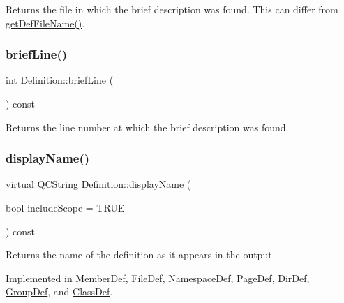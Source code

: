 Returns the file in which the brief description was found. This can differ from \mbox{\hyperlink{class_definition_a9484164b01eca0abce92001b2b77f8c3}{get\+Def\+File\+Name()}}. \mbox{\label{class_definition_a1f87d37cefff16dc8a300795543a7059}} 
\subsubsection{\texorpdfstring{briefLine()}{briefLine()}}
{\footnotesize\ttfamily int Definition\+::brief\+Line (\begin{DoxyParamCaption}{ }\end{DoxyParamCaption}) const}

Returns the line number at which the brief description was found. \mbox{\label{class_definition_ac4741f70f06baac174cf71b3e11d06ac}} 
\subsubsection{\texorpdfstring{displayName()}{displayName()}}
{\footnotesize\ttfamily virtual \mbox{\hyperlink{class_q_c_string}{Q\+C\+String}} Definition\+::display\+Name (\begin{DoxyParamCaption}\item[{bool}]{include\+Scope = {\ttfamily TRUE} }\end{DoxyParamCaption}) const\hspace{0.3cm}{\ttfamily [pure virtual]}}

Returns the name of the definition as it appears in the output 

Implemented in \mbox{\hyperlink{class_member_def_a3c91c8522caa2b1905cd52b3eedad8fa}{Member\+Def}}, \mbox{\hyperlink{class_file_def_ab5973477f072d780c9a184d16b58410b}{File\+Def}}, \mbox{\hyperlink{class_namespace_def_a7893c9a6525e3fc406ddfa9f9dd031f1}{Namespace\+Def}}, \mbox{\hyperlink{class_page_def_a29e7f4617718d605639095833d42d0a0}{Page\+Def}}, \mbox{\hyperlink{class_dir_def_a2771a73e6f4be26be57f2c71f097126c}{Dir\+Def}}, \mbox{\hyperlink{class_group_def_a9707ecaf7f4e7231016b68a7e3f811e8}{Group\+Def}}, and \mbox{\hyperlink{class_class_def_aa891187c2712372f19ee6c202df24fec}{Class\+Def}}.

\mbox{\label{class_definition_ab09272aa15b4047f0ab77652172cdd4b}} 
